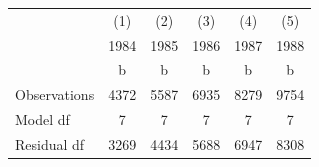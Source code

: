 {
\def\sym#1{\ifmmode^{#1}\else\(^{#1}\)\fi}
\begin{tabular}{l*{5}{c}}
\hline\hline
                    &\multicolumn{1}{c}{(1)}&\multicolumn{1}{c}{(2)}&\multicolumn{1}{c}{(3)}&\multicolumn{1}{c}{(4)}&\multicolumn{1}{c}{(5)}\\
                    &\multicolumn{1}{c}{1984}&\multicolumn{1}{c}{1985}&\multicolumn{1}{c}{1986}&\multicolumn{1}{c}{1987}&\multicolumn{1}{c}{1988}\\
                    &           b&           b&           b&           b&           b\\
\hline
\hline
Observations        &        4372&        5587&        6935&        8279&        9754\\
Model df            &           7&           7&           7&           7&           7\\
Residual df         &        3269&        4434&        5688&        6947&        8308\\
\hline\hline
\end{tabular}
}
